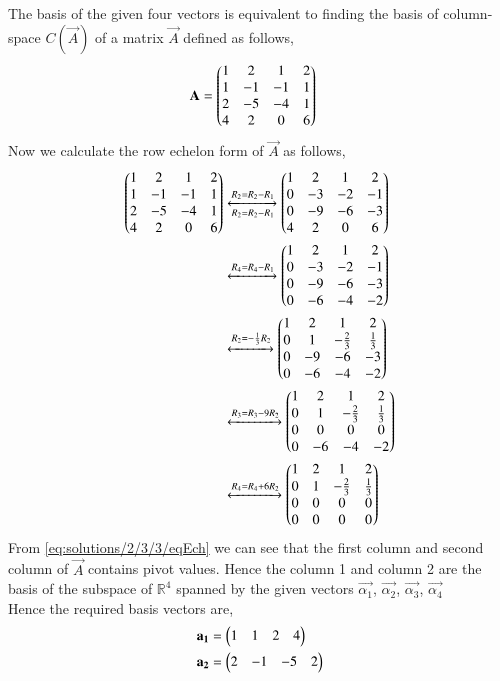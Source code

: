 The basis of the given four vectors is equivalent to finding the basis of column-space $C(\vec{A})$ of a matrix $\vec{A}$ defined as follows,
\begin{align}
\mathbf{A} &= \begin{pmatrix}1&2&1&2\\1&-1&-1&1\\2&-5&-4&1\\4&2&0&6\end{pmatrix}\label{eq:solutions/2/3/3/MatA}
\end{align}
Now we calculate the row echelon form of $\vec{A}$ as follows,
\begin{align}
\begin{pmatrix}1&2&1&2\\1&-1&-1&1\\2&-5&-4&1\\4&2&0&6\end{pmatrix} &\xleftrightarrow[R_2 = R_2-R_1]{R_2 = R_2-R_1}\begin{pmatrix}1&2&1&2\\0&-3&-2&-1\\0&-9&-6&-3\\4&2&0&6\end{pmatrix}\\
&\xleftrightarrow{R_4 = R_4-R_1}\begin{pmatrix}1&2&1&2\\0&-3&-2&-1\\0&-9&-6&-3\\0&-6&-4&-2\end{pmatrix}\\
&\xleftrightarrow{R_2 = -\frac{1}{3}R_2}\begin{pmatrix}1&2&1&2\\0&1&-\frac{2}{3}&\frac{1}{3}\\0&-9&-6&-3\\0&-6&-4&-2\end{pmatrix}\\&\xleftrightarrow{R_3 = R_3-9R_2}\begin{pmatrix}1&2&1&2\\0&1&-\frac{2}{3}&\frac{1}{3}\\0&0&0&0\\0&-6&-4&-2\end{pmatrix}\\
&\xleftrightarrow{R_4 = R_4+6R_2}\begin{pmatrix}1&2&1&2\\0&1&-\frac{2}{3}&\frac{1}{3}\\0&0&0&0\\0&0&0&0\end{pmatrix}\label{eq:solutions/2/3/3/eqEch}
\end{align}
From \eqref{eq:solutions/2/3/3/eqEch} we can see that the first column and second column of $\vec{A}$ contains pivot values. Hence the column 1 and column 2 are the basis of the subspace of $\mathbb{R}^{4}$ spanned by the given vectors $\vec{\alpha_1}$, $\vec{\alpha_2}$, $\vec{\alpha_3}$, $\vec{\alpha_4}$\\
Hence the required basis vectors are,
\begin{align}
\mathbf{a_1} &= \begin{pmatrix}1&1&2&4\end{pmatrix}\\
\mathbf{a_2} &= \begin{pmatrix}2&-1&-5&2\end{pmatrix}
\end{align}
